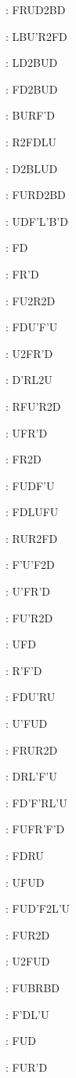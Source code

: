 \documentclass[9pt]{article}
\begin{document}
{\begin{multicols}{6}
: FRUD2BD

: LBU'R2FD

: LD2BUD

: FD2BUD

: BURF'D

: R2FDLU

: D2BLUD

: FURD2BD

: UDF'L'B'D

: FD

: FR'D

: FU2R2D

: FDU'F'U

: U2FR'D

: D'RL2U

: RFU'R2D

: UFR'D

: FR2D

: FUDF'U

: FDLUFU

: RUR2FD

: F'U'F2D

: U'FR'D

: FU'R2D

: UFD

: R'F'D

: FDU'RU

: U'FUD

: FRUR2D

: DRL'F'U

: FD'F'RL'U

: FUFR'F'D

: FDRU

: UFUD

: FUD'F2L'U

: FUR2D

: U2FUD

: FUBRBD

: F'DL'U

: FUD

: FUR'D


\end{multicols}}
\end{document}
